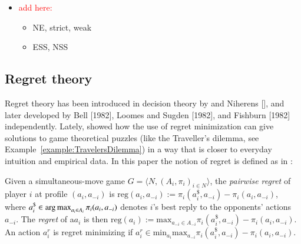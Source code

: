 \documentclass[fleqn,reqno,11pt]{article}
\begin{document}
\begin{itemize}
\item \textcolor{red}{add here:}
  \begin{itemize}
  \item NE, strict, weak
  \item ESS, NSS
  \end{itemize}
\end{itemize}


\subsection{Regret theory} \label{sec:regreTheory}

Regret theory has been introduced in decision theory by \citet{Savage1951:The-theory-of-s} and
Niherens [], and later developed by Bell [1982], Loomes and Sugden [1982], and Fishburn [1982]
independently. Lately, \citet{HalpernPass2012:Iterated-Regret} showed how the use of regret
minimization can give solutions to game theoretical puzzles (like the Traveller's dilemma, see
Example~\ref{example:TravelersDilemma}) in a way that is closer to everyday intuition and
empirical data. In this paper the notion of regret is defined as in
\citet{HalpernPass2012:Iterated-Regret}:

\begin{definition} \label{defn:regret} Given a simultaneous-move
  game $ G=\langle N, (A_i , \pi_i)_{i \in N} \rangle $, the \emph{pairwise regret} of player
  $i$ at profile $(a_i,a_{-i})$ is
  $\text{reg}(a_i,a_{-i}):= \pi_i(a_i^\$,a_{-i})-\pi_i(a_i,a_{-i}) $, where
  $a_i^\$ \in \operatorname*{arg\,max}_{a_i \in A_i} \pi_i(a_i, a_{-i})$ denotes $i$'s best reply to the
  opponents' actions $a_{-i}$. The \emph{regret} of a$a_i$ is then
  $\text{reg}(a_i):= \text{max}_{a_{-i}\in A_{-i}} \pi_i(a_i^\$,a_{-i})-\pi_i(a_i,a_{-i}) $. An
  action $a^{r}_i $ is regret minimizing if
  $a^{r}_i \in \text{min}_{a_i} \text{max}_{a_{-i}} \pi_i(a_i^\$,a_{-i})-\pi_i(a_i,a_{-i}) $.
\end{definition}
\end{document}
